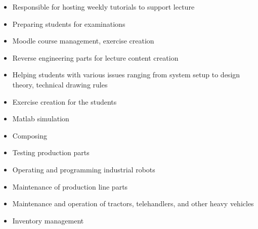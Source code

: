 \documentclass[10pt,a4paper,ragged2e,withhyper]{altacv}
\begin{document}
\begin{paracol}{2}


\begin{itemize}
\item Responsible for hosting weekly tutorials to support lecture
\item Preparing students for examinations
\item Moodle course management, exercise creation 
\end{itemize}

\divider

\begin{itemize}
\item Reverse engineering parts for lecture content creation
\item Helping students with various issues ranging from system setup to design theory, technical drawing rules
\end{itemize}

\divider

\begin{itemize}
\item Exercise creation for the students
\item Matlab simulation
\item Composing
\end{itemize}

\divider

\begin{itemize}
\item Testing production parts
\item Operating and programming industrial robots
\item Maintenance of production line parts
\end{itemize}

\divider

\begin{itemize}
  \item Maintenance and operation of tractors, telehandlers, and other heavy vehicles
  \item Inventory management
\end{itemize}


\end{paracol}
\end{document}

